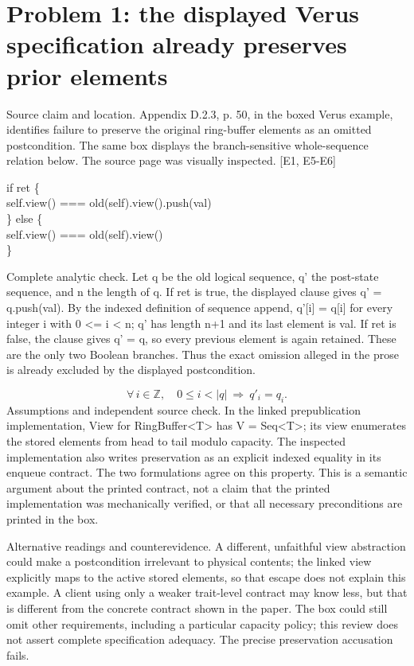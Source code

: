 \documentclass[10pt]{article}
\begin{document}
\section*{Problem 1: the displayed Verus specification already preserves prior elements}
Source claim and location. Appendix D.2.3, p. 50, in the boxed Verus example, identifies failure to preserve the original ring-buffer elements as an omitted postcondition. The same box displays the branch-sensitive whole-sequence relation below. The source page was visually inspected. [E1, E5-E6]\par
{\ttfamily\footnotesize if ret \{\\
    self.view() === old(self).view().push(val)\\
\} else \{\\
    self.view() === old(self).view()\\
\}}\par
Complete analytic check. Let q be the old logical sequence, q’ the post-state sequence, and n the length of q. If ret is true, the displayed clause gives q’ = q.push(val). By the indexed definition of sequence append, q’[i] = q[i] for every integer i with 0 <= i < n; q’ has length n+1 and its last element is val. If ret is false, the clause gives q’ = q, so every previous element is again retained. These are the only two Boolean branches. Thus the exact omission alleged in the prose is already excluded by the displayed postcondition.\par
\[\forall\,i\in\mathbb{Z},\quad 0\le i<|q|\ \Longrightarrow\ q'_i=q_i.\] Assumptions and independent source check. In the linked prepublication implementation, View for RingBuffer<T> has V = Seq<T>; its view enumerates the stored elements from head to tail modulo capacity. The inspected implementation also writes preservation as an explicit indexed equality in its enqueue contract. The two formulations agree on this property. This is a semantic argument about the printed contract, not a claim that the printed implementation was mechanically verified, or that all necessary preconditions are printed in the box.\par
Alternative readings and counterevidence. A different, unfaithful view abstraction could make a postcondition irrelevant to physical contents; the linked view explicitly maps to the active stored elements, so that escape does not explain this example. A client using only a weaker trait-level contract may know less, but that is different from the concrete contract shown in the paper. The box could still omit other requirements, including a particular capacity policy; this review does not assert complete specification adequacy. The precise preservation accusation fails.\par
\end{document}
